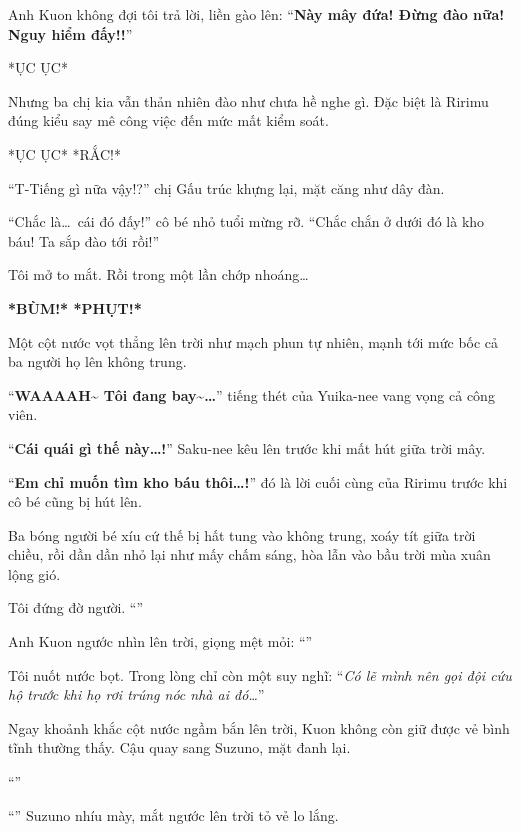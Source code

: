 \documentclass[../main.tex]{subfiles}
\begin{document}
Anh Kuon không đợi tôi trả lời, liền gào lên: ``\textbf{Này mây đứa! Đừng đào nữa! Nguy hiểm đấy!!}''

*ỤC ỤC*

Nhưng ba chị kia vẫn thản nhiên đào như chưa hề nghe gì. Đặc biệt là Ririmu đúng kiểu say mê công việc đến mức mất kiểm soát.

*ỤC ỤC* *RẮC!*

``T-Tiếng gì nữa vậy!?'' chị Gấu trúc khựng lại, mặt căng như dây đàn.

``Chắc là\dots\ cái đó đấy!'' cô bé nhỏ tuổi mừng rỡ. ``Chắc chắn ở dưới đó là kho báu! Ta sắp đào tới rồi!''

Tôi mở to mắt. Rồi trong một lần chớp nhoáng\dots

\textbf{*BÙM!* *PHỤT!*}


Một cột nước vọt thẳng lên trời như mạch phun tự nhiên, mạnh tới mức bốc cả ba người họ lên không trung.

``\textbf{WAAAAH\~{} Tôi đang bay\~{}\dots}'' tiếng thét của Yuika-nee vang vọng cả công viên.

``\textbf{Cái quái gì thế này\dots!}'' Saku-nee kêu lên trước khi mất hút giữa trời mây.

``\textbf{Em chỉ muốn tìm kho báu thôi\dots!}'' đó là lời cuối cùng của Ririmu trước khi cô bé cũng bị hút lên.

Ba bóng người bé xíu cứ thế bị hất tung vào không trung, xoáy tít giữa trời chiều, rồi dần dần nhỏ lại như mấy chấm sáng, hòa lẫn vào bầu trời mùa xuân lộng gió.

Tôi đứng đờ người. ``''

Anh Kuon ngước nhìn lên trời, giọng mệt mỏi: ``''

Tôi nuốt nước bọt. Trong lòng chỉ còn một suy nghĩ:
``\textit{Có lẽ mình nên gọi đội cứu hộ trước khi họ rơi trúng nóc nhà ai đó\dots}''

\omk

\pov{-}

Ngay khoảnh khắc cột nước ngầm bắn lên trời, Kuon không còn giữ được vẻ bình tĩnh thường thấy. Cậu quay sang Suzuno, mặt đanh lại.

``''

``'' Suzuno nhíu mày, mắt ngước lên trời tỏ vẻ lo lắng.
\end{document}
